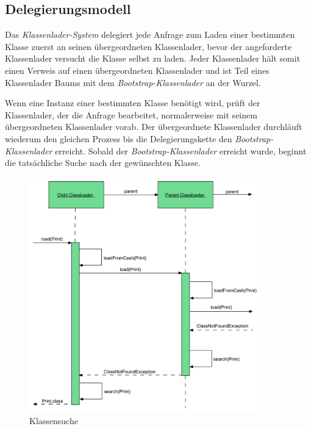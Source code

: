   \subsection{Delegierungsmodell} \label{sec:dm}
    
    Das \textit{Klassenlader-System} delegiert jede Anfrage zum Laden einer bestimmten Klasse zuerst an seinen übergeordneten Klassenlader, bevor der angeforderte Klassenlader versucht die Klasse selbst zu laden. Jeder Klassenlader hält somit einen Verweis auf einen übergeordneten Klassenlader und ist Teil eines Klassenlader Baums mit dem \textit{Bootstrap-Klassenlader} an der Wurzel. 

    Wenn eine Instanz einer bestimmten Klasse benötigt wird, prüft der Klassenlader, der die Anfrage bearbeitet, normalerweise mit seinem übergeordneten Klassenlader vorab. Der übergeordnete Klassenlader durchläuft wiederum den gleichen Prozess bis die Delegierungskette den \textit{Bootstrap-Klassenlader} erreicht. Sobald der \textit{Bootstrap-Klassenlader} erreicht wurde, beginnt die tatsächliche Suche nach der gewünschten Klasse.

    \begin{figure}[h]
      \centering
      \includegraphics[width=0.9\textwidth]{material/images/flussCL.pdf}
      \caption{Klassensuche \cite{Forman04javareflection}}
      \label{fig:deligation}
    \end{figure}

